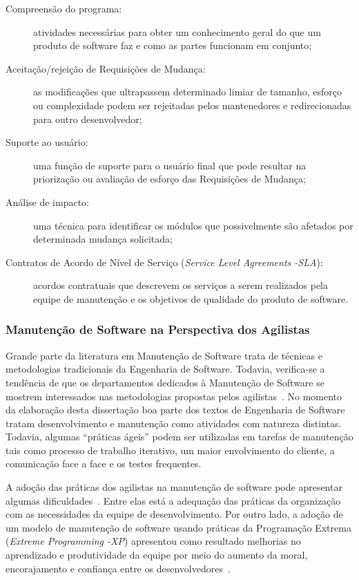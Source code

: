 \begin{description}
	\item[Compreensão do programa:] atividades necessárias para obter um
		conhecimento geral do que um produto de software faz e como as partes
		funcionam em conjunto;
    \item[Aceitação/rejeição de Requisições de Mudança:] as modificações que
        ultrapassem determinado limiar de tamanho, esforço ou complexidade podem
        ser rejeitadas pelos mantenedores e redirecionadas para outro
        desenvolvedor;
	\item[Suporte ao usuário:] uma função de suporte para o usuário final que
		pode resultar na priorização ou avaliação de esforço das Requisições
		de Mudança;
	\item[Análise de impacto:] uma técnica para identificar os módulos que
		possivelmente são afetados por determinada mudança solicitada;
	\item[Contratos de Acordo de Nível de Serviço (\textit{Service Level Agreements
		\@-\@ SLA}):] acordos contratuais que descrevem os serviços a serem
		realizados pela equipe de manutenção e os objetivos de qualidade do
		produto de software.
\end{description}

\subsubsection{Manutenção de Software na Perspectiva dos Agilistas}\label{sub:manutenção_de_software_com_método_dos_agilistas}

Grande parte da literatura em Manutenção de Software trata de técnicas e
metodologias tradicionais da Engenharia de Software. Todavia, verifica-se a
tendência de que os departamentos dedicados à Manutenção de Software se mostrem
interessados nas metodologias propostas pelos agilistas~\cite{Heeager2015}.  No
momento da elaboração desta dissertação boa parte dos textos de Engenharia de
Software tratam desenvolvimento e manutenção como atividades com natureza
distintas. Todavia, algumas ``práticas ágeis'' podem ser utilizadas em tarefas
de manutenção tais como processo de trabalho iterativo, um maior envolvimento
do cliente, a comunicação face a face e os testes frequentes.

A adoção das práticas dos agilistas na manutenção de software pode apresentar
algumas dificuldades~\cite{1402140}. Entre elas está a adequação das práticas
da organização com as necessidades da equipe de desenvolvimento. Por outro
lado, a adoção de um modelo de manutenção de software usando práticas da
Programação Extrema (\textit{Extreme Programming \@-\@ XP}) apresentou como
resultado melhorias no aprendizado e produtividade da equipe por meio do
aumento da moral, encorajamento e confiança entre os
desenvolvedores~\cite{Choudhari:2014:EIM:2557833.2557845}.

